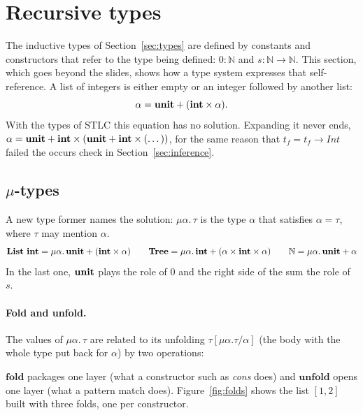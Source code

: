 \section{Recursive types}
\label{sec:recursive}

The inductive types of Section~\ref{sec:types} are defined by constants and
constructors that refer to the type being defined: $0 : \mathbb{N}$ and
$s : \mathbb{N} \to \mathbb{N}$. This section, which goes beyond the slides, shows how a
type system expresses that self-reference. A list of integers is either empty
or an integer followed by another list:
\[
\alpha = \mathbf{unit} + (\mathbf{int} \times \alpha).
\]
With the types of STLC this equation has no solution. Expanding it never ends,
$\alpha = \mathbf{unit} + \mathbf{int} \times (\mathbf{unit} + \mathbf{int} \times (\dots))$, for the same reason that
$t_f = t_f \to \mathit{Int}$ failed the occurs check in Section~\ref{sec:inference}.

\subsection{$\mu$-types}

A new type former names the solution: $\mu\alpha.\, \tau$ is the type $\alpha$ that
satisfies $\alpha = \tau$, where $\tau$ may mention $\alpha$.
\[
\mathbf{List}\ \mathbf{int} = \mu\alpha.\, \mathbf{unit} + (\mathbf{int} \times \alpha)
\qquad
\mathbf{Tree} = \mu\alpha.\, \mathbf{int} + (\alpha \times \mathbf{int} \times \alpha)
\qquad
\mathbb{N} = \mu\alpha.\, \mathbf{unit} + \alpha
\]
In the last one, $\mathbf{unit}$ plays the role of $0$ and the right side of the sum
the role of $s$.

\paragraph{Fold and unfold.} The values of $\mu\alpha.\, \tau$ are related to its
unfolding $\tau[\mu\alpha.\tau / \alpha]$ (the body with the whole type put back for
$\alpha$) by two operations:
$\mathbf{fold}$ packages one layer (what a constructor such as \textit{cons}
does) and $\mathbf{unfold}$ opens one layer (what a pattern match does).
Figure~\ref{fig:folds} shows the list $[1, 2]$ built with three folds, one per
constructor.

